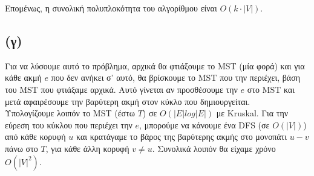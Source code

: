 		Επομένως, η συνολική πολυπλοκότητα του αλγορίθμου είναι $O(k\cdot|V|)$.
		
		\subsection*{(γ)}
			Για να λύσουμε αυτό το πρόβλημα, αρχικά θα φτιάξουμε το MST (μία φορά) και για κάθε ακμή $e$ που δεν ανήκει σ' αυτό, θα βρίσκουμε το MST που την περιέχει, βάση του MST που φτιάξαμε αρχικά. Αυτό γίνεται αν προσθέσουμε την $e$ στο MST και μετά αφαιρέσουμε την βαρύτερη ακμή στον κύκλο που δημιουργείται. \\
			
			Υπολογίζουμε λοιπόν το MST (έστω $T$) σε $O(|E|log|E|)$ με Kruskal. Για την εύρεση του κύκλου που περιέχει την $e$, μπορούμε να κάνουμε ένα DFS (σε $O(|V|)$) από κάθε κορυφή $u$ και κρατάγαμε το βάρος της βαρύτερης ακμής στο μονοπάτι $u - v$ πάνω στο $Τ$, για κάθε άλλη κορυφή $v \neq u$. Συνολικά λοιπόν θα είχαμε χρόνο $O(|V|^2)$.
